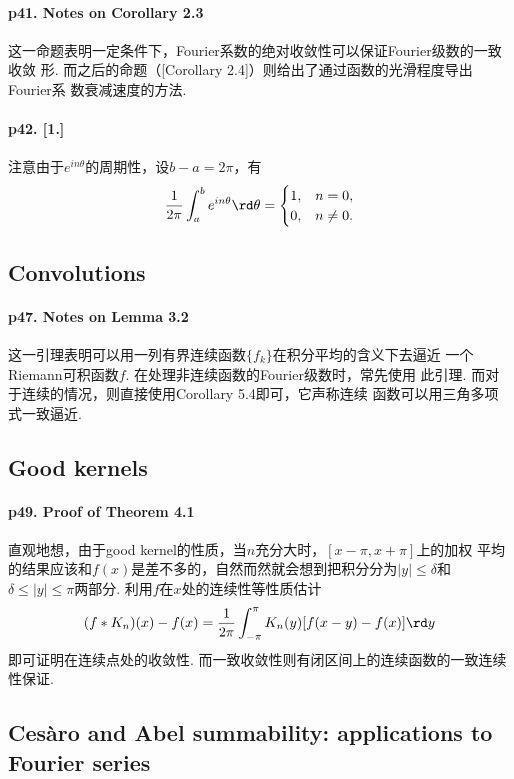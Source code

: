   \paragraph{p41. Notes on Corollary 2.3}
    这一命题表明一定条件下，Fourier系数的绝对收敛性可以保证Fourier级数的一致收敛
    形. 而之后的命题（[Corollary 2.4]）则给出了通过函数的光滑程度导出Fourier系
    数衰减速度的方法.

  \paragraph{p42. [1.]}
    注意由于$e^{in\theta}$的周期性，设$b-a=2\pi$，有
    \[
      \frac{1}{2\pi}\int_{a}^be^{in\theta}\rd\theta = 
      \begin{cases}
        1, & n = 0, \\
        0, & n \ne 0.
      \end{cases}
    \]

\subsection{Convolutions}
  \paragraph{p47. Notes on Lemma 3.2}
    这一引理表明可以用一列有界连续函数$\{f_k\}$在积分平均的含义下去逼近
    一个Riemann可积函数$f$. 在处理非连续函数的Fourier级数时，常先使用
    此引理. 而对于连续的情况，则直接使用Corollary 5.4即可，它声称连续
    函数可以用三角多项式一致逼近.

\subsection{Good kernels}
  \paragraph{p49. Proof of Theorem 4.1}
    直观地想，由于good kernel的性质，当$n$充分大时，$[x-\pi,x+\pi]$上的加权
    平均的结果应该和$f(x)$是差不多的，自然而然就会想到把积分分为$|y|\le\delta$和
    $\delta\le|y|\le\pi$两部分. 利用$f$在$x$处的连续性等性质估计
    \[
      (f\ast K_n)(x) - f(x) = \frac{1}{2\pi}\int_{-\pi}^\pi
      K_n(y)[f(x-y)-f(x)]\rd y
    \]
    即可证明在连续点处的收敛性. 而一致收敛性则有闭区间上的连续函数的一致连续性保证.

\subsection{Cesàro and Abel summability: applications to Fourier series}
